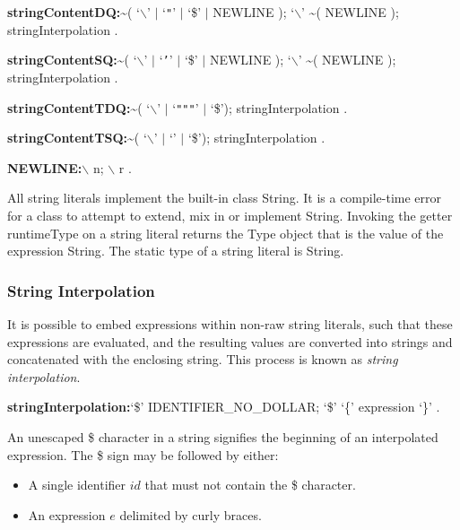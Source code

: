 \documentclass{article}
\newcommand{\code}[1]{{\sf #1}}
\begin{document}
\begin{grammar}
 {\bf stringContentDQ:}\~{}( `$\backslash$' $|$ `{\escapegrammar \texttt{"}}' $|$ `\$' $|$ NEWLINE );
      `$\backslash$'  \~{}( NEWLINE );
     stringInterpolation
    .

 {\bf stringContentSQ:}\~{}( `$\backslash$' $|$ `{\escapegrammar \texttt{'}}' $|$ `\$' $|$ NEWLINE );
      `$\backslash$'  \~{}( NEWLINE );
     stringInterpolation
    .


 {\bf stringContentTDQ:}\~{}( `$\backslash$' $|$  `{\escapegrammar \texttt{"""}}' $|$ `\$');
     stringInterpolation
    .

 {\bf stringContentTSQ:}\~{}( `$\backslash$' $|$ `{\escapegrammar \code{'}\code{'}\code{'}}' $|$ `\$');
     stringInterpolation
    .

{\bf NEWLINE:}$\backslash$ n;
      $\backslash$ r
    .

 \end{grammar}

\LMHash{}
All string literals implement the built-in class \code{String}. It is a compile-time error for a class to attempt to extend, mix in or implement \code{String}. Invoking the getter \code{runtimeType} on a string literal returns the \code{Type} object that is the value of the expression \code{String}. The static type of a string literal is \code{String}.

\subsubsection{String Interpolation}

\LMHash{}
It is possible to embed expressions within non-raw string literals, such that these expressions are evaluated, and the resulting values are converted into strings and concatenated with the enclosing string. This process is known as {\em string interpolation}.

 \begin{grammar}
{\bf stringInterpolation:}`\$' IDENTIFIER\_NO\_DOLLAR;
      `\$' `\{' expression `\}' %
    .
 \end{grammar}


\LMHash{}
An unescaped \$ character in a string signifies the beginning of an interpolated expression.  The \$ sign may be followed by either:
\begin{itemize}
\item A single identifier $id$ that must not contain the \$ character.
\item An expression $e$ delimited by curly braces.
\end{itemize}
\end{document}
